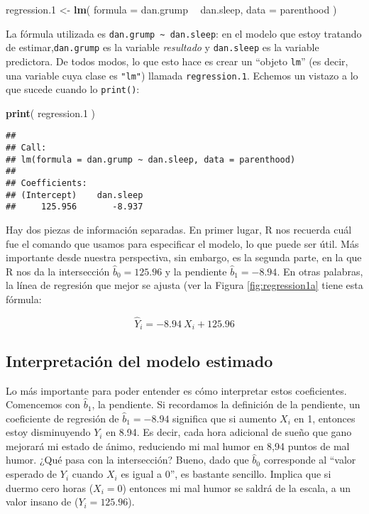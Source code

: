 \documentclass[
]{book}
\newenvironment{Shaded}{\begin{snugshade}}{\end{snugshade}}
\newcommand{\DataTypeTok}[1]{\textcolor[rgb]{0.13,0.29,0.53}{#1}}
\newcommand{\FloatTok}[1]{\textcolor[rgb]{0.00,0.00,0.81}{#1}}
\newcommand{\KeywordTok}[1]{\textcolor[rgb]{0.13,0.29,0.53}{\textbf{#1}}}
\newcommand{\NormalTok}[1]{#1}
\newcommand{\OperatorTok}[1]{\textcolor[rgb]{0.81,0.36,0.00}{\textbf{#1}}}
\newcommand{\StringTok}[1]{\textcolor[rgb]{0.31,0.60,0.02}{#1}}
\begin{document}
\begin{Shaded}
\begin{Highlighting}[]
\NormalTok{regression}\FloatTok{.1}\NormalTok{ <-}\StringTok{ }\KeywordTok{lm}\NormalTok{( }\DataTypeTok{formula =}\NormalTok{ dan.grump }\OperatorTok{~}\StringTok{ }\NormalTok{dan.sleep,  }
                    \DataTypeTok{data =}\NormalTok{ parenthood )  }
\end{Highlighting}
\end{Shaded}

La fórmula utilizada es \texttt{dan.grump\ \textasciitilde{}\ dan.sleep}: en el modelo que estoy tratando de estimar,\texttt{dan.grump} es la variable \emph{resultado} y \texttt{dan.sleep} es la variable predictora. De todos modos, lo que esto hace es crear un ``objeto \texttt{lm}'' (es decir, una variable cuya clase es \texttt{"lm"}) llamada \texttt{regression.1}. Echemos un vistazo a lo que sucede cuando lo \texttt{print()}:

\begin{Shaded}
\begin{Highlighting}[]
\KeywordTok{print}\NormalTok{( regression}\FloatTok{.1}\NormalTok{ )}
\end{Highlighting}
\end{Shaded}

\begin{verbatim}
## 
## Call:
## lm(formula = dan.grump ~ dan.sleep, data = parenthood)
## 
## Coefficients:
## (Intercept)    dan.sleep  
##     125.956       -8.937
\end{verbatim}

Hay dos piezas de información separadas. En primer lugar, R nos recuerda cuál fue el comando que usamos para especificar el modelo, lo que puede ser útil. Más importante desde nuestra perspectiva, sin embargo, es la segunda parte, en la que R nos da la intersección \(\hat{b}_0=125.96\) y la pendiente \(\hat{b}_1=-8.94\). En otras palabras, la línea de regresión que mejor se ajusta (ver la Figura \ref{fig:regression1a} tiene esta fórmula:

\[
\hat{Y}_i = -8.94 \ X_i + 125.96
\]

\hypertarget{interpretaciuxf3n-del-modelo-estimado}{%
\subsection{Interpretación del modelo estimado}\label{interpretaciuxf3n-del-modelo-estimado}}

Lo más importante para poder entender es cómo interpretar estos coeficientes. Comencemos con \(\hat{b}_1\), la pendiente. Si recordamos la definición de la pendiente, un coeficiente de regresión de \(\hat{b}_1=-8.94\) significa que si aumento \(X_i\) en 1, entonces estoy disminuyendo \(Y_i\) en 8.94. Es decir, cada hora adicional de sueño que gano mejorará mi estado de ánimo, reduciendo mi mal humor en 8,94 puntos de mal humor. ¿Qué pasa con la intersección? Bueno, dado que \(\hat{b}_0\) corresponde al ``valor esperado de \(Y_i\) cuando \(X_i\) es igual a 0'', es bastante sencillo. Implica que si duermo cero horas (\(X_i=0\)) entonces mi mal humor se saldrá de la escala, a un valor insano de (\(Y_i=125.96\)).
\end{document}
